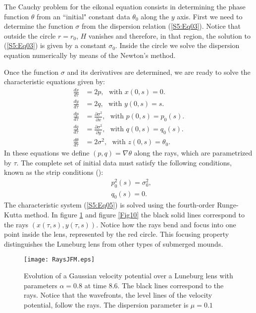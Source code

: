 The Cauchy problem for the eikonal equation consists in determining the phase function $\theta$ from an ``initial" constant data $\theta_0$ along the $y$ axis. 
First we need to determine the function $\sigma$ from the dispersion relation (\ref{S5:Eq03}). Notice that outside the circle $r=r_0$, $H$ vanishes and therefore, in that region, the solution to (\ref{S5:Eq03}) is given by a constant $\sigma_0$. Inside the circle we solve the dispersion equation numerically by means of the Newton's method.

Once the function $\sigma$ and its derivatives are determined, 
we are ready to solve the characteristic equations given by:
\begin{equation}\label{S5:Eq05}
\begin{aligned}
\frac{dx}{d\tau} &=2p,\ \ \ \text{with $x(0,s)=0$.}\\
\frac{dy}{d\tau} &=2q,\ \ \ \text{with $y(0,s)=s$.}\\
\frac{dp}{d\tau} &= \frac{\partial\sigma^2}{\partial x},\ \ \ \text{with $p(0,s)=p_0(s)$.}\\
\frac{dq}{d\tau} &= \frac{\partial\sigma^2}{\partial y},\ \ \ \text{with $q(0,s)=q_0(s)$.}\\
\frac{d\theta}{d\tau} &= 2\sigma^2,\ \ \ \text{with $z(0,s)=\theta_0$.}
\end{aligned}
\end{equation}
In these equations we define  $(p,q) = \nabla \theta$ along the rays, which are parametrized by $\tau$. 
The complete set of  initial data must satisfy the following conditions, known as the strip conditions (\cite{Zauderer}):
\begin{equation}\label{S5:Eq06}
\begin{aligned}
&  p_0^2(s) = \sigma_0^2,\\
& q_0(s) = 0.
\end{aligned}
\end{equation}
The characteristic system (\ref{S5:Eq05}) is solved using the fourth-order Runge-Kutta method.
In figure \ref{Fig09} and figure \ref{Fig10} the black solid lines correspond to the rays $(x(\tau,s),y(\tau,s))$. 
Notice how the rays bend and focus into one point inside the lens, represented by the red circle. 
This focusing property distinguishes the Luneburg lens from other types of submerged mounds.
\begin{figure}
\texttt{[image: RaysJFM.eps]}
\caption{Evolution of a Gaussian velocity potential over a Luneburg lens with parameters $\alpha = 0.8$ at time $8.6$. The black lines correspond to the rays. Notice that the wavefronts, the level lines of the velocity potential, follow the rays.
The dispersion parameter is $\mu = 0.1$}
\label{Fig09}
\end{figure} 
